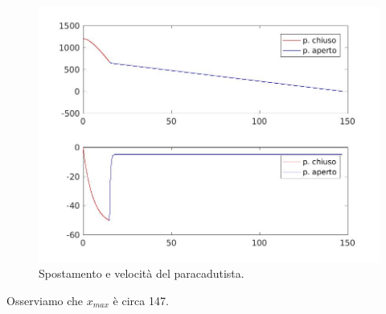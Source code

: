 \documentclass[11pt,a4paper,twoside,openright,titlepage,
headinclude,footinclude,BCOR5mm,
numbers=noenddot,cleardoublepage=empty,
tablecaptionabove]{scrbook}
\begin{document}
\begin{center}
\begin{figure}[h!]
\includegraphics[width=\textwidth]{figs/ese1.jpg}
\caption{Spostamento e velocità del paracadutista.}
\end{figure}
\end{center}
\newpage
Osserviamo che $x_{max}$ è circa 147.
\end{document}
